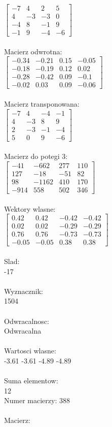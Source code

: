 \documentclass[a4paper,12pt]{article}
\begin{document}
$\begin{bmatrix} -7&4&2&5\\4&-3&-3&0\\-4&8&-1&9\\-1&9&-4&-6 \end{bmatrix}$
\\
\\
Macierz odwrotna:\\

$\begin{bmatrix} -0.34&-0.21&0.15&-0.05\\-0.18&-0.19&0.12&0.02\\-0.28&-0.42&0.09&-0.1\\-0.02&0.03&0.09&-0.06 \end{bmatrix}$
\\
\\
Macierz transponowana:\\

$\begin{bmatrix} -7&4&-4&-1\\4&-3&8&9\\2&-3&-1&-4\\5&0&9&-6 \end{bmatrix}$
\\
\\
Macierz do potegi 3:\\

$\begin{bmatrix} -41&-662&277&110\\127&-18&-51&82\\98&-1162&410&170\\-914&558&502&346 \end{bmatrix}$
\\
\\
Wektory wlasne:\\

$\begin{bmatrix} 0.42&0.42&-0.42&-0.42\\0.02&0.02&-0.29&-0.29\\0.76&0.76&-0.73&-0.73\\-0.05&-0.05&0.38&0.38 \end{bmatrix}$
\\
\\
Slad:\\
-17
\\
\\
Wyznacznik:\\
1504
\\
\\
Odwracalnosc:\\
Odwracalna
\\
\\
Wartosci wlasne:\\
-3.61 -3.61 -4.89 -4.89
\\
\\
Suma elementow:\\
12
\\
\newpage
Numer macierzy:
388
\\
\\
Macierz:\\
\end{document}
